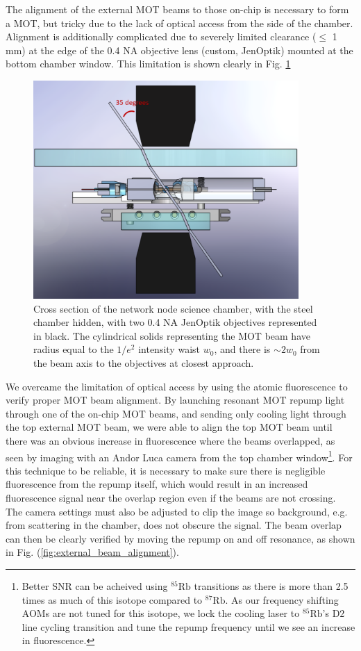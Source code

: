 The alignment of the external MOT beams to those on-chip is necessary to form a MOT,
but tricky due to the lack of optical access from the side of the chamber. Alignment is additionally complicated due to severely limited clearance ($\leq$ 1 mm) at the edge of the 0.4 NA objective lens (custom, JenOptik) mounted at the bottom chamber window. This limitation is shown clearly in Fig. \ref{fig:chamber_cross_section}
\begin{figure}[!ht]
    \centering
    \includegraphics[width=0.9\textwidth]{Images/chamber_cross_section.pdf}
    \caption{Cross section of the network node science chamber, with the steel chamber hidden, with two 0.4 NA JenOptik objectives represented in black. The cylindrical solids representing the MOT beam have radius equal to the $1/e^2$ intensity waist $w_0$, and there is $\sim2w_0$ from the beam axis to the objectives at closest approach.}
    \label{fig:chamber_cross_section}
\end{figure}
We overcame the limitation of optical access by using the atomic fluorescence to verify proper MOT beam alignment. By launching resonant MOT repump light through one of the on-chip MOT beams, and sending only cooling light through the top external MOT beam, we were able to align the top MOT beam until there was an obvious increase in fluorescence where the beams overlapped, as seen by imaging with an Andor Luca camera from the top chamber window\footnote{Better SNR can be acheived using $^{85}\text{Rb}$ transitions as there is more than 2.5 times as much of this isotope compared to $^{87}\text{Rb}$. As our frequency shifting AOMs are not tuned for this isotope, we lock the cooling laser to $^{85}\text{Rb}$'s $\text{D}2$ line cycling transition and tune the repump frequency until we see an increase in fluorescence.}. For this technique to be reliable, it is necessary to make sure there is negligible fluorescence from the repump itself, which would result in an increased fluorescence signal near the overlap region even if the beams are not crossing. The camera settings must also be adjusted to clip the image so background, e.g. from scattering in the chamber, does not obscure the signal. The beam overlap can then be clearly verified by moving the repump on and off resonance, as shown in Fig. (\ref{fig:external_beam_alignment}).
